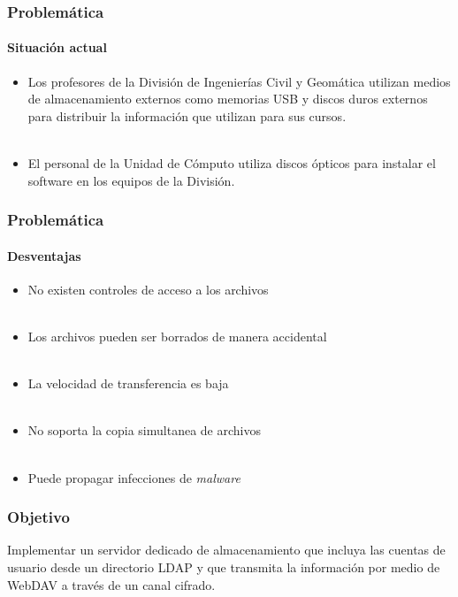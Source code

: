\documentclass{beamer}
\begin{document}
\begin{frame}
\frametitle{Problem\'{a}tica}
\framesubtitle{Situaci\'{o}n actual}

\begin{itemize}
\justifying
  \item Los profesores de la Divisi\'{o}n de Ingenier\'{i}as Civil y Geom\'{a}tica utilizan medios de almacenamiento externos como memorias USB y discos duros externos para distribuir la informaci\'{o}n que utilizan para sus cursos.
\\~\\
  \item El personal de la Unidad de C\'{o}mputo utiliza discos \'{o}pticos para instalar el software en los equipos de la Divisi\'{o}n.
\end{itemize}

\centering
 {
  
 }

\end{frame}
\begin{frame}
\frametitle{Problem\'{a}tica}
\framesubtitle{Desventajas}
\justifying

\begin{itemize}
\justifying
  \item No existen controles de acceso a los archivos
\\~\\
  \item Los archivos pueden ser borrados de manera accidental
\\~\\
  \item La velocidad de transferencia es baja
\\~\\
  \item No soporta la copia simultanea de archivos
\\~\\
  \item Puede propagar infecciones de \textit{malware}
\end{itemize}

\end{frame}
\begin{frame}

\frametitle{Objetivo}
\justifying

Implementar un servidor dedicado de almacenamiento que incluya las cuentas de usuario desde un directorio \textup{LDAP} y que transmita la informaci\'{o}n por medio de \textup{WebDAV} a trav\'{e}s de un canal cifrado.

\vspace{3em}

\centering
 {
  
 }

\end{frame}
\end{document}

